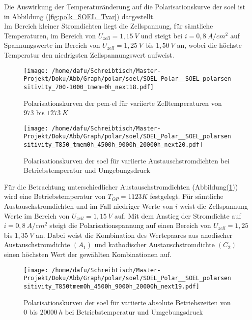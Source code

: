 \documentclass[onecolumn,10pt,titlepage]{article}
\begin{document}
Die Auswirkung der Temperaturänderung auf die Polarisationskurve der \gls{soel} ist in Abbildung (\ref{fig:polk_SOEL_Tvar}) dargestellt.\\
Im Bereich kleiner Stromdichten liegt die Zellspannung, für sämtliche Temperaturen, im Bereich von $U_{zell}=1,15~V$ und steigt bei $i=0,8~A/cm^2$ auf Spannungswerte im Bereich von $U_{zell}=1,25~V$ bis $1,50~V$ an, wobei die höchste Temperatur den niedrigsten Zellspannungswert aufweist.\\
\begin{figure}[H]
	\centering
	\begin{minipage}[t]{0.49\textwidth}
		\texttt{[image: /home/dafu/Schreibtisch/Master-Projekt/Doku/Abb/Graph/polar/soel/SOEL\_Polar\_\_SOEL\_polarsensitivity\_700-1000\_tmem=0h\_next18.pdf]}
		
		\caption[Polarisationskurven der \gls{pem}-\gls{el} für variierte Zelltemperaturen]{Polarisationskurven der \gls{pem}-\gls{el} für variierte Zelltemperaturen von $973$ bis $1273~K$}
		\label{fig:polk_SOEL_Tvar} 
	\end{minipage}
	\hfill
	\begin{minipage}[t]{0.49\textwidth}
		\texttt{[image: /home/dafu/Schreibtisch/Master-Projekt/Doku/Abb/Graph/polar/soel/SOEL\_Polar\_\_SOEL\_polarsensitivity\_T850\_tmem0h\_4500h\_9000h\_20000h\_next20.pdf]}
		
		\caption[Polarisationskurven der \gls{soel} für variierte Austauschstromdichten]{Polarisationskurven der \gls{soel} für variierte Austauschstromdichten bei Betriebstemperatur und Umgebungsdruck}
		\label{fig:polk_SOEL_i0var} 
	\end{minipage}
\end{figure}
Für die Betrachtung unterschiedlicher Austauschstromdichten (Abbildung(\ref{fig:polk_SOEL_i0var})) wird eine Betriebstemperatur von $T_{OP}=1123K$ festgelegt. Für sämtliche Austauschstromdichten und  im Fall niedriger Werte von $i$ weist die Zellspannung Werte im Bereich von $U_{zell}=1,15~V$ auf. Mit dem Anstieg der Stromdichte auf $i=0,8~A/cm^2$ steigt die Polarisationspannung auf einen Bereich von $U_{zell}=1,25$ bis $1,35~V$ an. Dabei weist die Kombination des Wertepaares aus anodischer Austauschstromdichte $(A_1)$ und kathodischer Austauschstromdichte $(C_2)$ einen höchsten Wert der gewählten Kombinationen auf. 
\begin{figure}[H]
	
	\centering
	\texttt{[image: /home/dafu/Schreibtisch/Master-Projekt/Doku/Abb/Graph/polar/soel/SOEL\_Polar\_\_SOEL\_polarsensitivity\_T850tmem0h\_4500h\_9000h\_20000h\_next19.pdf]}
	\caption[Polarisationskurven der \gls{soel} für variierte absolute Betriebszeiten]{Polarisationskurven der \gls{soel} für variierte absolute Betriebszeiten von $0$ bis $20000~h$ bei Betriebstemperatur und Umgebungsdruck}
	\label{fig:polk_SOEL_tmemvar} 
\end{figure}
\end{document}
